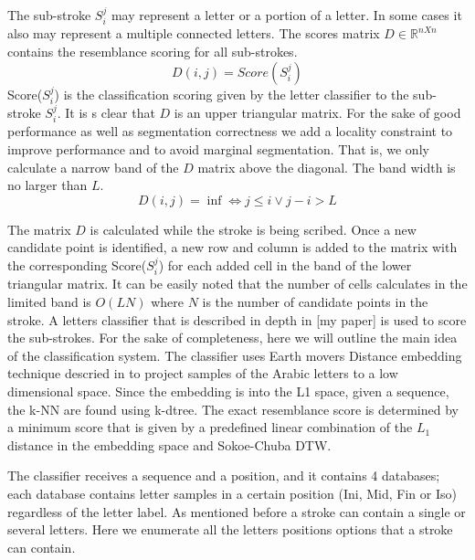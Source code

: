 \documentclass[journal,compsoc]{IEEEtran}
\begin{document}
The sub-stroke  $S_{i}^{j}$ may represent a letter or a portion of a letter. In some cases it also may represent a multiple connected letters. The scores matrix $D\in\mathbb{R}^{nXn}$ contains the resemblance scoring for all sub-strokes. 
\begin{equation}
D(i,j)=Score(S_{i}^{j})
\end{equation}
Score($S_{i}^{j}$) is the classification scoring given by the letter classifier to the sub-stroke $S_{i}^{j}$. It is s clear that $D$ is an upper triangular matrix. For the sake of good performance as well as segmentation correctness we add a locality constraint to improve performance and to avoid marginal segmentation. That is, we only calculate a narrow band of the $D$ matrix above the diagonal. The band width is no larger than $L$.
\begin{equation}
D(i,j)=\inf \Leftrightarrow j \leq i \vee j-i>L 
\end{equation}

The matrix $D$ is calculated while the stroke is being scribed. Once a new candidate point is identified, a new row and column is added to the matrix with the corresponding Score($S_{i}^{j}$) for each added cell in the band of the lower triangular matrix. It can be easily noted that the number of cells calculates in the limited band is $O(LN)$ where $N$ is the number of candidate points in the stroke. 
A letters classifier that is described in depth in [my paper] is used to score the sub-strokes. For the sake of completeness, here we will outline the main idea of the classification system. The classifier uses Earth movers Distance embedding technique descried in \cite{shirdhonkar2008approximate} to project samples of the Arabic letters to a low dimensional space. Since the embedding is into the L1 space, given a sequence, the k-NN are found using k-dtree. The exact resemblance score is determined by a minimum score that is given by a predefined linear combination of the $L_{1}$ distance in the embedding space and Sokoe-Chuba DTW.

The classifier receives a sequence and a position, and it contains 4 databases; each database contains letter samples in a certain position (Ini, Mid, Fin or Iso) regardless of the letter label. As mentioned before a stroke can contain a single or several letters. Here we enumerate all the letters positions options that a stroke can contain.  
\end{document}
